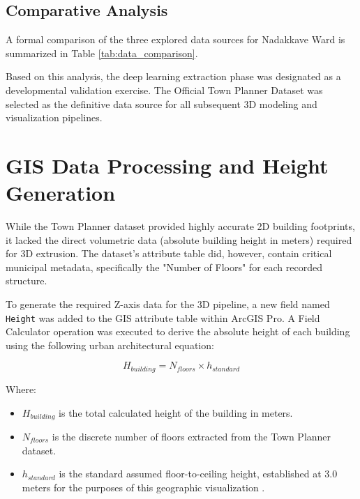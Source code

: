 \subsection{Comparative Analysis}
A formal comparison of the three explored data sources for Nadakkave Ward is summarized in Table \ref{tab:data_comparison}.

\begin{table}[htbp]
    \centering
    \caption{Comparative analysis of spatial data sources for Nadakkave Ward.}
    \label{tab:data_comparison}
    
\end{table}

Based on this analysis, the deep learning extraction phase was designated as a developmental validation exercise. The Official Town Planner Dataset was selected as the definitive data source for all subsequent 3D modeling and visualization pipelines.

\section{GIS Data Processing and Height Generation}
While the Town Planner dataset provided highly accurate 2D building footprints, it lacked the direct volumetric data (absolute building height in meters) required for 3D extrusion. The dataset's attribute table did, however, contain critical municipal metadata, specifically the "Number of Floors" for each recorded structure.

To generate the required Z-axis data for the 3D pipeline, a new field named \texttt{Height} was added to the GIS attribute table within ArcGIS Pro. A Field Calculator operation was executed to derive the absolute height of each building using the following urban architectural equation:

\begin{equation}
    H_{building} = N_{floors} \times h_{standard}
    \label{eq:height}
\end{equation}

Where:
\begin{itemize}
    \item $H_{building}$ is the total calculated height of the building in meters.
    \item $N_{floors}$ is the discrete number of floors extracted from the Town Planner dataset.
    \item $h_{standard}$ is the standard assumed floor-to-ceiling height, established at 3.0 meters for the purposes of this geographic visualization \cite{ref_standard_floor_height}.
\end{itemize}

